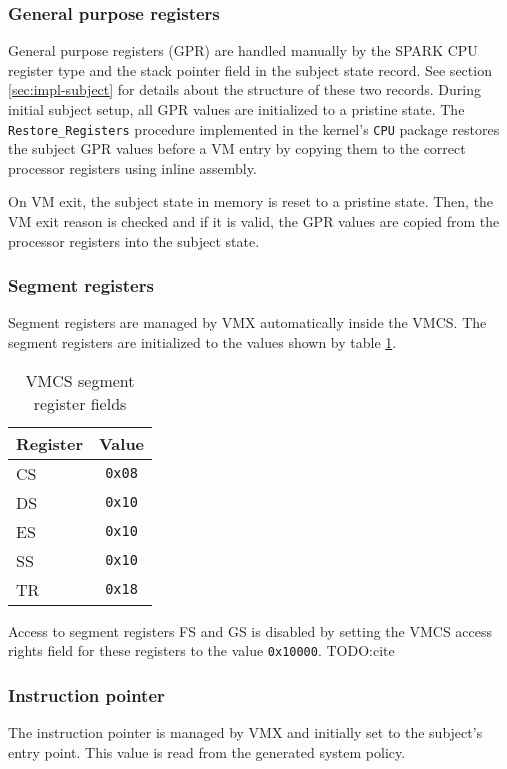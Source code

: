 \subsubsection{General purpose registers}
General purpose registers (GPR) are handled manually by the SPARK
CPU register type and the stack pointer field in the subject state record. See
section \ref{sec:impl-subject} for details about the structure of these two
records.  During initial subject setup, all GPR values are initialized to a
pristine state. The \texttt{Restore\_Registers} procedure implemented in the
kernel's \texttt{CPU} package restores the subject GPR values before a VM entry
by copying them to the correct processor registers using inline assembly.

On VM exit, the subject state in memory is reset to a pristine state. Then, the
VM exit reason is checked and if it is valid, the GPR values are copied from the
processor registers into the subject state.

\subsubsection{Segment registers}
Segment registers are managed by VMX automatically inside the VMCS. The segment
registers are initialized to the values shown by table
\ref{tab:vmcs-segment-regs}.

\begin{table}[h]
	\centering
	\begin{tabular}{l|c}
		\textbf{Register} & \textbf{Value} \\
		\hline
		CS & \texttt{0x08} \\
		DS & \texttt{0x10} \\
		ES & \texttt{0x10} \\
		SS & \texttt{0x10} \\
		TR & \texttt{0x18} \\
		\hline
	\end{tabular}
	\caption{VMCS segment register fields}
	\label{tab:vmcs-segment-regs}
\end{table}

Access to segment registers FS and GS is disabled by setting the VMCS access
rights field for these registers to the value \texttt{0x10000}.
TODO:cite

\subsubsection{Instruction pointer}
The instruction pointer is managed by VMX and initially set to the subject's
entry point. This value is read from the generated system policy.

